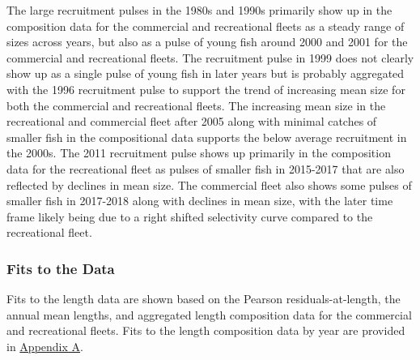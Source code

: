 \documentclass[11pt,
  english,
  a4paper,
]{article}
\begin{document}
The large recruitment pulses in the 1980s and 1990s primarily show up in the composition data for the commercial and recreational fleets as a steady range of sizes across years, but also as a pulse of young fish around 2000 and 2001 for the commercial and recreational fleets. The recruitment pulse in 1999 does not clearly show up as a single pulse of young fish in later years but is probably aggregated with the 1996 recruitment pulse to support the trend of increasing mean size for both the commercial and recreational fleets. The increasing mean size in the recreational and commercial fleet after 2005 along with minimal catches of smaller fish in the compositional data supports the below average recruitment in the 2000s. The 2011 recruitment pulse shows up primarily in the composition data for the recreational fleet as pulses of smaller fish in 2015-2017 that are also reflected by declines in mean size. The commercial fleet also shows some pulses of smaller fish in 2017-2018 along with declines in mean size, with the later time frame likely being due to a right shifted selectivity curve compared to the recreational fleet.

\leavevmode\tagmcend\tagstructend\par


\hypertarget{fits-to-the-data}{%
\subsubsection{Fits to the Data}\label{fits-to-the-data}}

\leavevmode\tagmcend\tagstructend


Fits to the length data are shown based on the Pearson residuals-at-length, the annual mean lengths, and aggregated length composition data for the commercial and recreational fleets. Fits to the length composition data by year are provided in {\protect\hyperlink{append_a}{Appendix A}\leavevmode\tagmcend\tagstructend}.

\leavevmode\tagmcend\tagstructend\par

\end{document}
